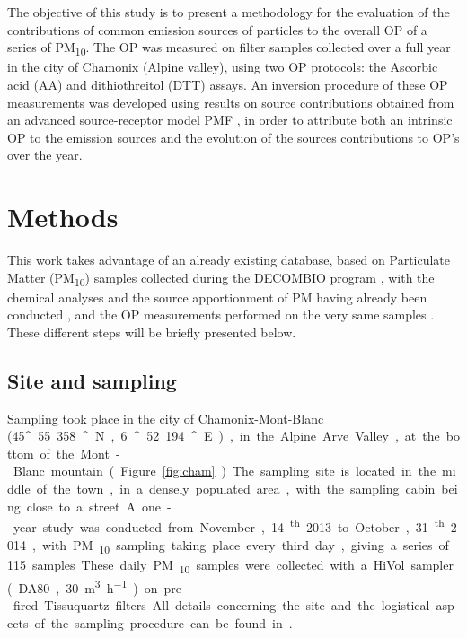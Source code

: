 \documentclass[acp, manuscript]{copernicus}
\begin{document}
The objective of this study is to present a methodology for the evaluation of
the contributions of common emission sources of particles to the overall OP of a
series of PM\textsubscript{10}. The OP was measured on filter samples collected
over a full year in the city of Chamonix (Alpine valley), using two OP
protocols: the Ascorbic acid (AA) and dithiothreitol (DTT) assays. An inversion
procedure of these OP measurements was developed using results on source
contributions obtained from an advanced source-receptor model PMF
\citep{chevrier_chauffage_2016}, in order to attribute both an intrinsic OP to
the emission sources and the evolution of the sources contributions to OP's over
the year.


\section{Methods}

This work takes advantage of an already existing database, based on Particulate
Matter (PM\textsubscript{10}) samples collected during the DECOMBIO program
\citep{chevrier_decombio-contribution_2016}, with the chemical analyses and the
source apportionment of PM having already been conducted
\citep{chevrier_chauffage_2016}, and the OP measurements performed on the very
same samples \citep{calas_comparison_2018}.  These different steps will be
briefly presented below.

\subsection{Site and sampling}\label{site-and-sampling}

Sampling took place in the city of Chamonix-Mont-Blanc (45\unit{^\circ}55.358\unit{^\prime}~N,
6\unit{^\circ}52.194\unit{^\prime}~E), in the Alpine Arve Valley, at the bottom of the
Mont-Blanc mountain (Figure~\ref{fig:cham}). The sampling site is located in the
middle of the town, in a densely populated area, with the sampling cabin being
close to a street. A one-year study was conducted from November,
14\textsuperscript{th} 2013 to October, 31\textsuperscript{th} 2014, with
PM\textsubscript{10} sampling taking place every third day, giving a series of
115 samples. These daily PM\textsubscript{10} samples were collected with a
HiVol sampler (DA80, 30~\unit{m^3~h^{-1}}) on pre-fired Tissuquartz filters. All details
concerning the site and the logistical aspects of the sampling procedure can be
found in \citet{chevrier_chauffage_2016}.
\end{document}

